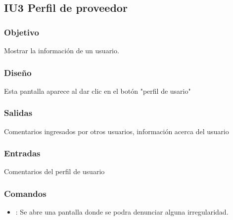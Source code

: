 
\subsection{IU3 Perfil de proveedor}

\subsubsection{Objetivo}
	Mostrar la información de un usuario.
	
\subsubsection{Diseño}
	Esta pantalla aparece al dar clic en el botón "perfil de usario" 	


\subsubsection{Salidas}

	Comentarios ingresados por otros usuarios, información acerca del usuario

\subsubsection{Entradas}
	Comentarios del perfil de usuario

\subsubsection{Comandos}
\begin{itemize}
	\item {}: Se abre una pantalla donde se podra denunciar alguna irregularidad.
\end{itemize}
